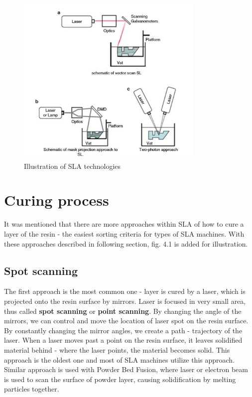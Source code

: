 \documentclass[a4paper, twoside, 11pt]{report}
\begin{document}
\begin{figure}[t]
  \centering
  \includegraphics[width=0.8\textwidth]{SLAillustration}
  \caption{Illustration of SLA technologies}
\end{figure}
%
\section{Curing process} 
It was mentioned that there are more approaches within SLA of how to cure a layer of the resin - the easiest sorting criteria for types of SLA machines. With these approaches described in following section, fig. 4.1 is added for illustration.
\subsection{Spot scanning}
The first approach is the most common one - layer is cured by a laser, which is projected onto the resin surface by mirrors. Laser is focused in very small area, thus called \textbf{spot scanning} or \textbf{point scanning}. By changing the angle of the mirrors, we can control and move the location of laser spot on the resin surface. By constantly changing the mirror angles, we create a path - trajectory of the laser. When a laser moves past a point on the resin surface, it leaves solidified material behind - where the laser points, the material becomes solid. This approach is the oldest one and most of SLA machines utilize this approach. Similar approach is used with Powder Bed Fusion, where laser or electron beam is used to scan the surface of powder layer, causing solidification by melting particles together.
\end{document}
